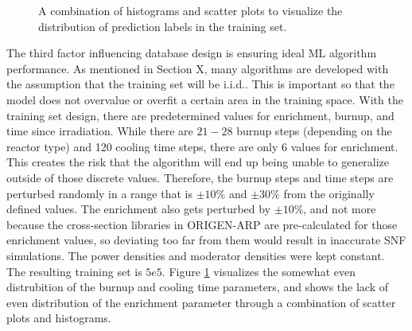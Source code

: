 \begin{figure}[!htb]
  \caption{A combination of histograms and scatter plots to visualize the 
           distribution of prediction labels in the training set.}
  \label{fig:trainhist}
\end{figure}

 The third factor influencing database
design is ensuring ideal \gls{ML} algorithm performance.  As mentioned in
Section X, many algorithms are developed with the assumption that the training
set will be \acrfull{i.i.d.}.  This is important so that the model does not
overvalue or overfit a certain area in the training space. With the training
set design, there are predetermined values for enrichment, burnup, and time
since irradiation.  While there are $21-28$ burnup steps (depending on the
reactor type) and 120 cooling time steps, there are only 6 values for
enrichment. This creates the risk that the algorithm will end up being unable
to generalize outside of those discrete values. Therefore, the burnup steps and
time steps are perturbed randomly in a range that is $\pm10\%$ and $\pm30\%$
from the originally defined values.  The enrichment also gets perturbed by
$\pm10\%$, and not more because the cross-section libraries in \gls{ORIGEN-ARP}
are pre-calculated for those enrichment values, so deviating too far from them
would result in inaccurate \gls{SNF} simulations. The power densities and
moderator densities were kept constant.  The resulting training set is $5e5$.
Figure \ref{fig:trainhist} visualizes the somewhat even distrubition of the
burnup and cooling time parameters, and shows the lack of even distribution of
the enrichment parameter through a combination of scatter plots and
histograms. 

